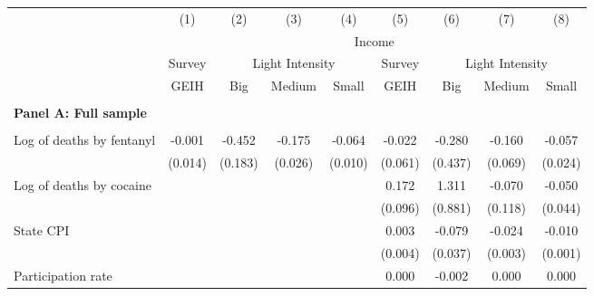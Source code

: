 \begin{tabular}{lcccccccc} \\ \hline 
                    &\multicolumn{1}{c}{(1)}         &\multicolumn{1}{c}{(2)}         &\multicolumn{1}{c}{(3)}         &\multicolumn{1}{c}{(4)}         &\multicolumn{1}{c}{(5)}         &\multicolumn{1}{c}{(6)}         &\multicolumn{1}{c}{(7)}         &\multicolumn{1}{c}{(8)}         \\
 & \multicolumn{8}{c}{Income} \\ \cline{2-5} \cline{6-9}   & Survey  &  \multicolumn{3}{c}{Light Intensity} & Survey & \multicolumn{3}{c}{Light Intensity} \\ \cline{3-5} \cline{7-9} & GEIH & Big & Medium & Small & GEIH & Big & Medium & Small \\ \hline  & & & & &  &  &  &  \\ \textbf{Panel A: Full sample} \\ & & & & & & & & \\
Log of deaths by fentanyl&      -0.001         &      -0.452\sym{**} &      -0.175\sym{***}&      -0.064\sym{***}&      -0.022         &      -0.280         &      -0.160\sym{*}  &      -0.057\sym{*}  \\
                    &     (0.014)         &     (0.183)         &     (0.026)         &     (0.010)         &     (0.061)         &     (0.437)         &     (0.069)         &     (0.024)         \\
\addlinespace
Log of deaths by cocaine&                     &                     &                     &                     &       0.172         &       1.311         &      -0.070         &      -0.050         \\
                    &                     &                     &                     &                     &     (0.096)         &     (0.881)         &     (0.118)         &     (0.044)         \\
\addlinespace
State CPI           &                     &                     &                     &                     &       0.003         &      -0.079\sym{*}  &      -0.024\sym{***}&      -0.010\sym{***}\\
                    &                     &                     &                     &                     &     (0.004)         &     (0.037)         &     (0.003)         &     (0.001)         \\
\addlinespace
Participation rate  &                     &                     &                     &                     &       0.000         &      -0.002         &       0.000         &       0.000         \\

\end{tabular}
